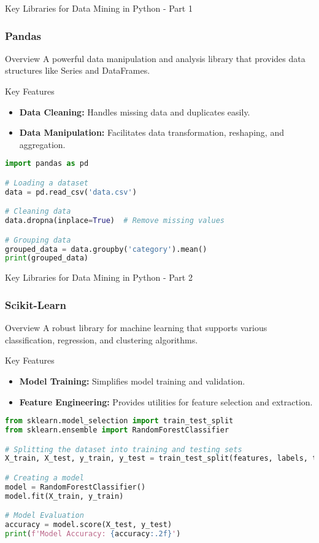 \documentclass[aspectratio=169]{beamer}
\begin{document}
\begin{frame}[fragile]{Key Libraries for Data Mining in Python - Part 1}
    \frametitle{Pandas}
    \begin{block}{Overview}
        A powerful data manipulation and analysis library that provides data structures like Series and DataFrames.
    \end{block}
    \begin{block}{Key Features}
        \begin{itemize}
            \item \textbf{Data Cleaning:} Handles missing data and duplicates easily.
            \item \textbf{Data Manipulation:} Facilitates data transformation, reshaping, and aggregation.
        \end{itemize}
    \end{block}
    \begin{lstlisting}[language=Python]
import pandas as pd

# Loading a dataset
data = pd.read_csv('data.csv')

# Cleaning data
data.dropna(inplace=True)  # Remove missing values

# Grouping data
grouped_data = data.groupby('category').mean()
print(grouped_data)
    \end{lstlisting}
\end{frame}

\begin{frame}[fragile]{Key Libraries for Data Mining in Python - Part 2}
    \frametitle{Scikit-Learn}
    \begin{block}{Overview}
        A robust library for machine learning that supports various classification, regression, and clustering algorithms.
    \end{block}
    \begin{block}{Key Features}
        \begin{itemize}
            \item \textbf{Model Training:} Simplifies model training and validation.
            \item \textbf{Feature Engineering:} Provides utilities for feature selection and extraction.
        \end{itemize}
    \end{block}
    \begin{lstlisting}[language=Python]
from sklearn.model_selection import train_test_split
from sklearn.ensemble import RandomForestClassifier

# Splitting the dataset into training and testing sets
X_train, X_test, y_train, y_test = train_test_split(features, labels, test_size=0.2)

# Creating a model
model = RandomForestClassifier()
model.fit(X_train, y_train)

# Model Evaluation
accuracy = model.score(X_test, y_test)
print(f'Model Accuracy: {accuracy:.2f}')
    \end{lstlisting}
\end{frame}
\end{document}
